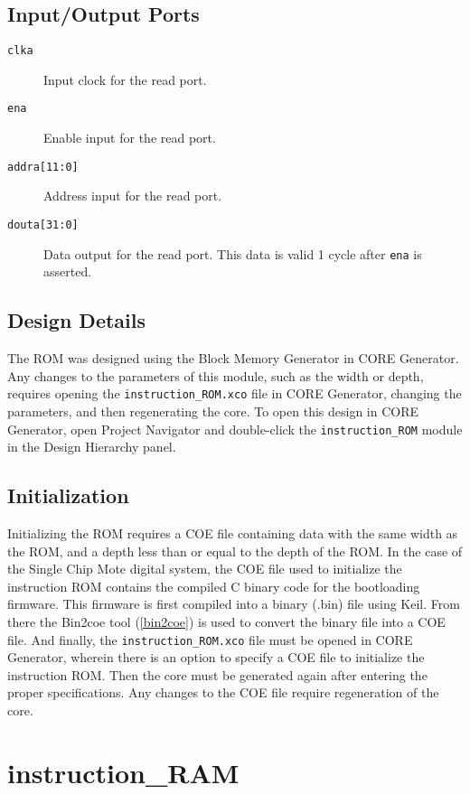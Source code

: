 \subsection{Input/Output Ports}
\begin{description}
	\item[\texttt{clka}] Input clock for the read port.
	\item[\texttt{ena}] Enable input for the read port.
	\item[\texttt{addra[11:0]}] Address input for the read port.
	\item[\texttt{douta[31:0]}] Data output for the read port. This data is valid 1 cycle after \texttt{ena} is asserted.
\end{description}

\subsection{Design Details}
The ROM was designed using the Block Memory Generator in CORE Generator. Any changes to the parameters of this module, such as the width or depth, requires opening the \texttt{instruction\_ROM.xco} file in CORE Generator, changing the parameters, and then regenerating the core. To open this design in CORE Generator, open Project Navigator and double-click the \texttt{instruction\_ROM} module in the Design Hierarchy panel.

\subsection{Initialization} \label{instruction-ROM}
Initializing the ROM requires a COE file containing data with the same width as the ROM, and a depth less than or equal to the depth of the ROM. In the case of the Single Chip Mote digital system, the COE file used to initialize the instruction ROM contains the compiled C binary code for the bootloading firmware. This firmware is first compiled into a binary (.bin) file using Keil. From there the Bin2coe tool (\ref{bin2coe}) is used to convert the binary file into a COE file. And finally, the \texttt{instruction\_ROM.xco} file must be opened in CORE Generator, wherein there is an option to specify a COE file to initialize the instruction ROM. Then the core must be generated again after entering the proper specifications. Any changes to the COE file require regeneration of the core.

\section{instruction\_RAM} \label{instruction-RAM}
